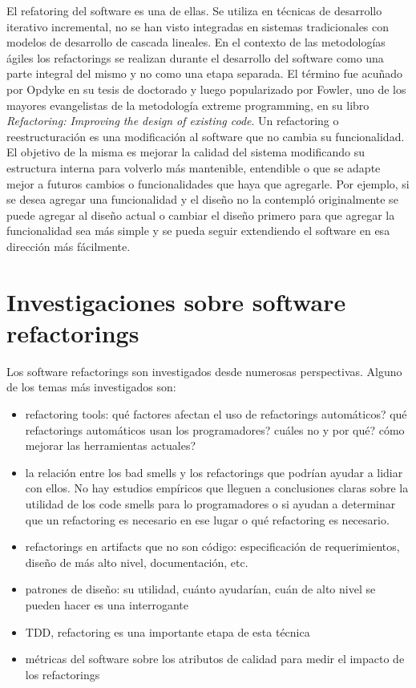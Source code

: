 El refatoring del software es una de ellas. Se utiliza en técnicas de desarrollo iterativo
incremental, no se han visto integradas en sistemas tradicionales con modelos de desarrollo de cascada lineales.
En el contexto de las metodologías ágiles los refactorings se realizan durante el desarrollo del
software como una parte integral del mismo y no como una etapa separada. El término fue acuñado por
Opdyke en su tesis de doctorado y luego popularizado por Fowler, uno de los mayores evangelistas de
la metodología extreme programming, en su libro \textit{Refactoring: Improving the design of existing code}.
Un refactoring o reestructuración es una modificación al software que no cambia su funcionalidad. El objetivo
de la misma es mejorar la calidad del sistema modificando su estructura interna para volverlo más mantenible,
entendible o que se adapte mejor a futuros cambios o funcionalidades que haya que agregarle. Por
ejemplo, si se desea agregar una funcionalidad y el diseño no la contempló originalmente se puede
agregar al diseño actual o cambiar el diseño primero para que agregar la funcionalidad sea más
simple y se pueda seguir extendiendo el software en esa dirección más fácilmente.


\section{Investigaciones sobre software refactorings}
Los software refactorings son investigados desde numerosas perspectivas. Alguno de los temas más
investigados son:
\begin{itemize}
    \item refactoring tools: qué factores afectan el uso de refactorings automáticos? qué
refactorings automáticos usan los programadores? cuáles no y por qué? cómo mejorar las herramientas actuales?
    \item la relación entre los bad smells y los refactorings que podrían ayudar a lidiar con ellos. No hay estudios
empíricos que lleguen a conclusiones claras sobre la utilidad de los code smells para lo
programadores o si ayudan a determinar que un refactoring es necesario en ese lugar o qué
refactoring es necesario.
    \item refactorings en artifacts que no son código: especificación de requerimientos, diseño de más alto nivel, documentación, etc.
    \item patrones de diseño: su utilidad, cuánto ayudarían, cuán de alto nivel se pueden hacer es una interrogante
    \item TDD, refactoring es una importante etapa de esta técnica 
    \item métricas del software sobre los atributos de calidad para medir el impacto de los
refactorings  
\end{itemize}


